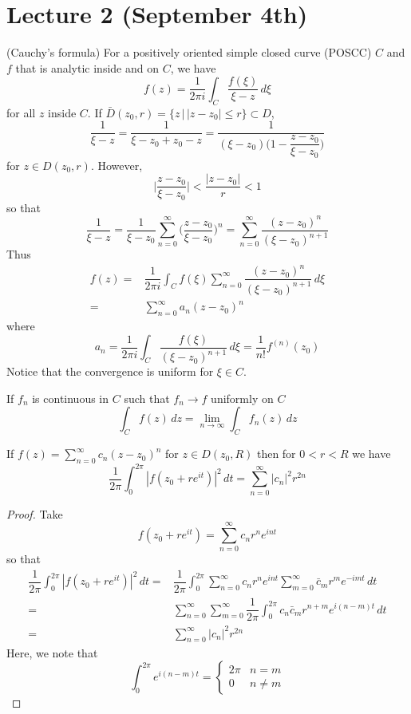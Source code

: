 \section{Lecture 2 (September 4th)}
\begin{recall}
(Cauchy's formula) For a positively oriented simple closed curve (POSCC) $C$ and $f$ that  is analytic inside and on $C$, we have
\[f(z)=\dfrac{1}{2\pi i}\int _{C}\dfrac{f(\xi )}{\xi -z}\,d\xi \]
for all $z$ inside $C$. If $\bar{D}(z_0,r)=\{z \,|\, |z-z_0|\leq r\}\subset D$,
\[\dfrac{1}{\xi -z}=\dfrac{1}{\xi -z_0+z_0-z}=\dfrac{1}{(\xi -z_0)\Big(1-\dfrac{z-z_0}{\xi -z_0}\Big)}\]
for $z\in D(z_0,r)$. However,
\[\Big|\dfrac{z-z_0}{\xi -z_0}\Big|<\dfrac{|z-z_0|}{r}<1\]
so that
\[\dfrac{1}{\xi -z}=\dfrac{1}{\xi -z_0}\sum ^{\infty }_{n=0}\Big(\dfrac{z-z_0}{\xi -z_0}\Big)^{n}=\sum ^{\infty }_{n=0}\dfrac{(z-z_0)^{n}}{(\xi -z_0)^{n+1}}\]
Thus
\[\begin{align*}
	f(z)=&\dfrac{1}{2\pi i}\int _{C}f(\xi )\sum ^{\infty }_{n=0}\dfrac{(z-z_0)^{n}}{(\xi -z_0)^{n+1}}\,d\xi \\
	=&\sum ^{\infty }_{n=0}a_{n}(z-z_0)^{n}
\end{align*}\]
where
\[a_{n}=\dfrac{1}{2\pi i}\int _{C}\dfrac{f(\xi )}{(\xi -z_0)^{n+1}}\,d\xi =\dfrac{1}{n!}f^{(n)}(z_0)\]
Notice that the convergence is uniform for $\xi \in C$.
\end{recall}
\vspace{2ex}
\begin{thm}
If $f_{n}$ is continuous in $C$ such that $f_{n}\rightarrow f$ uniformly on $C$
\[\int _{C}f(z)\,dz=\lim _{n\rightarrow \infty }\int _{C}f_{n}(z)\,dz\]
\end{thm}
\vspace{2ex}
\begin{thm}
If $f(z)=\sum ^{\infty }_{n=0}c_{n}(z-z_0)^{n}$ for $z\in D(z_0,R)$ then for $0<r<R$ we have
\[\dfrac{1}{2\pi }\int ^{2\pi }_{0}|f(z_0+re^{it})|^2\,dt=\sum ^{\infty }_{n=0}|c_{n}|^2r^{2n}\]
\end{thm}
\vspace{2ex}
\begin{proof}
Take
	\[f(z_0+re^{it})=\sum ^{\infty }_{n=0}c_{n}r^{n}e^{int }\]
so that
\[\begin{align*}
	\dfrac{1}{2\pi }\int ^{2\pi }_{0}|f(z_0+re^{it})|^2\,dt=&\dfrac{1}{2\pi }\int ^{2\pi }_{0}\sum ^{\infty }_{n=0}c_{n}r^{n}e^{in t}\sum ^{\infty }_{m=0}\bar{c}_{m}r^{m}e^{-imt}\,dt\\
	=&\sum ^{\infty }_{n=0}\sum ^{\infty }_{m=0}\dfrac{1}{2\pi }\int ^{2\pi }_{0}c_{n}\bar{c}_{m}r^{n+m}e^{i(n-m)t}\,dt\\
	=&\sum ^{\infty }_{n=0}|c_{n}|^2r^{2n}
\end{align*}\]
Here, we note that
\[\int ^{2\pi }_{0}e^{i(n-m)t}=
\begin{cases}
	2\pi &n=m\\
	0&n\ne m
\end{cases}
\]
\end{proof}
